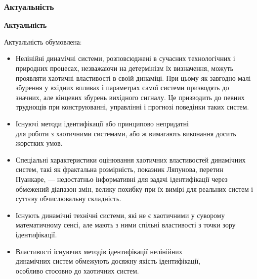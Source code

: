 \documentclass[14pt,handout,utf8]{beamer}
\newcommand{\Xhead}[1]{
 \begin{center}%
      \textbf{#1}%
 \end{center}%
}
\begin{document}
\begin{frame}
  \frametitle{Актуальність}

  \Xhead{Актуальність}

   Актуальність обумовлена:

  \begin{itemize}

    \item \justifying
      Нелінійні динамічні системи, розповсюджені в сучасних технологічних і
      природних процесах, незважаючи на детер\-мі\-нізм їх визначення, можуть проявляти
      хаотичні властивості в своїй динаміці. При цьому як завгодно малі збурення у вхідних
      впливах і параметрах самої системи призводять до значних, але кінцевих збурень
      вихідного сигналу. Це призводить до певних труднощів при конструюванні,
      управлінні і прогнозі поведінки таких систем.

    \item \justifying
      Існуючі методи ідентифікації або принципово непридатні \\
      для роботи з хаотичними системами, або ж вимагають виконання досить
      жорстких умов.

    \item \justifying
      Спеціальні характеристики оцінювання хаотичних властивостей динамічних
      систем, такі як фрактальна розмірність, показник Ляпунова, перетин Пуанкаре, ---
      недостатньо інформативні для задачі ідентифікації через обмежений діапазон
      змін, велику похибку при їх вимірі для реальних систем і суттєву
      обчислювальну складність.

    \item \justifying
      Існують динамічні технічні системи, які не є хаотичними у суворому математичному сенсі,
      але мають з ними спільні властивості
      з точки зору ідентифікації.

    \item \justifying
      Властивості існуючих методів ідентифікації нелінійних \\
      динамічних систем обмежують досяжну якість ідентифікації,\\
      особливо стосовно до хаотичних систем.

  \end{itemize}


\end{frame}




\end{document}
